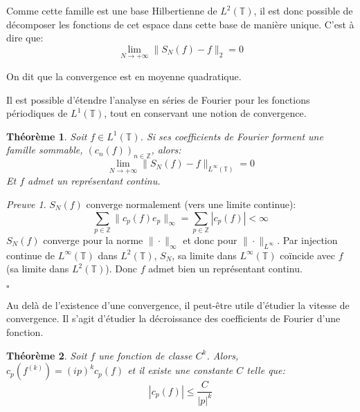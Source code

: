 \documentclass[]{article}
\newtheorem{mythm}{Théorème}
\theoremstyle{remark}
\newtheorem{myproof}{Preuve}
\theoremstyle{definition}
\newcommand{\cqfd}{
	\hfill$\square$
}
\begin{document}
		Comme cette famille est une base Hilbertienne de $L^2(\mathbb{T})$, il est donc possible de décomposer les fonctions de cet espace dans cette base de manière unique. C'est à dire que:
				$$ \lim_{N\to +\infty} \|S_N(f) -f \|_2 = 0 $$
				
		On dit que la convergence est en moyenne quadratique. 


	Il est possible d'étendre l'analyse en séries de Fourier pour les fonctions périodiques de $L^1(\mathbb{T})$, tout en conservant une notion de convergence. 
	
	\begin{mythm}
		Soit $f \in L^1(\mathbb{T})$. Si ses coefficients de Fourier forment une famille sommable, $(c_n(f))_{n\in\mathbb{Z}} $, alors: 
		$$ \lim_{N\to +\infty} \|S_N(f) -f \|_{L^\infty(\mathbb{T})} = 0 $$ 
		Et $f$ admet un représentant continu. 

	\end{mythm}
			
	\begin{myproof}

		$S_N(f)$ converge normalement (vers une limite continue): 
		$$ \sum_{p \in \mathbb{Z}} \|c_p(f)e_p\|_\infty = \sum_{p \in \mathbb{Z}} |c_p(f)| < \infty $$
		$S_N(f)$ converge pour la norme $\| \cdot \|_\infty $ et donc pour $\| \cdot \|_{L^{\infty}} $.
		Par injection continue de $L^\infty(\mathbb{T})$ dans $L^2(\mathbb{T})$, $S_N$, sa limite dans $L^\infty(\mathbb{T})$ coïncide avec $f$ (sa limite dans $L^2(\mathbb{T})$). Donc $f$ admet bien un représentant continu. 
		
		\cqfd
	\end{myproof}
	
	
			
	Au delà de l'existence d'une convergence, il peut-être utile d'étudier la vitesse de convergence. Il s'agit d'étudier la décroissance des coefficients de Fourier d'une fonction. 
	
	\begin{mythm}
		Soit $f$ une fonction de classe $C^k$. Alors, $c_p(f^{(k)}) = (ip)^kc_p(f)$ et il existe une constante $C$ telle que:
			$$ | c_p(f) | \leqslant \frac{C}{|p|^k} $$
	\end{mythm}
	
\end{document}
